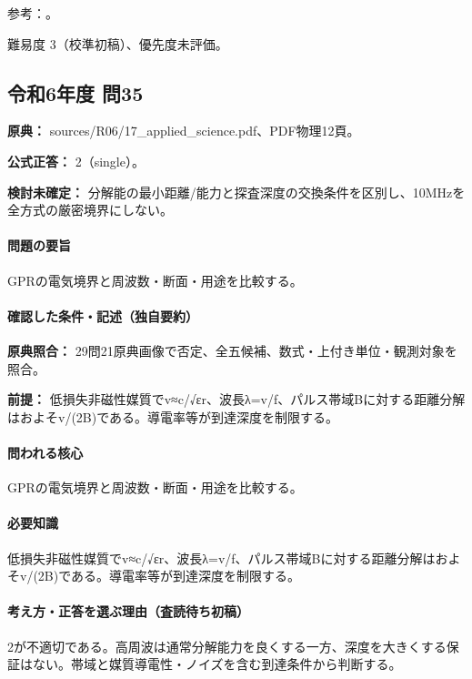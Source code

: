 \par 参考：\cite{epa_gpr}。

\par 難易度 3（校準初稿）、優先度未評価。

\subsection{令和6年度 問35}
\label{q:r06-reg-applied-35}

\noindent\textbf{原典：} sources/R06/17\_applied\_science.pdf、PDF物理12頁。

\textbf{公式正答：} 2（single）。

\par\textbf{検討未確定：} 分解能の最小距離/能力と探査深度の交換条件を区別し、10MHzを全方式の厳密境界にしない。

\paragraph{問題の要旨} GPRの電気境界と周波数・断面・用途を比較する。

\paragraph{確認した条件・記述（独自要約）}\mbox{}\par

\noindent\textbf{原典照合：} 29問21原典画像で否定、全五候補、数式・上付き単位・観測対象を照合。\par

\noindent\textbf{前提：} 低損失非磁性媒質でv≈c/√εr、波長λ=v/f、パルス帯域Bに対する距離分解はおよそv/(2B)である。導電率等が到達深度を制限する。\par

\paragraph{問われる核心} GPRの電気境界と周波数・断面・用途を比較する。

\paragraph{必要知識} 低損失非磁性媒質でv≈c/√εr、波長λ=v/f、パルス帯域Bに対する距離分解はおよそv/(2B)である。導電率等が到達深度を制限する。

\paragraph{考え方・正答を選ぶ理由（査読待ち初稿）} 2が不適切である。高周波は通常分解能力を良くする一方、深度を大きくする保証はない。帯域と媒質導電性・ノイズを含む到達条件から判断する。

